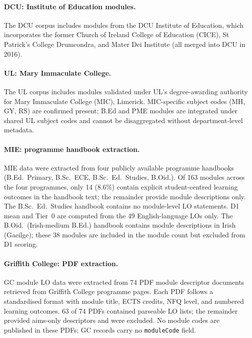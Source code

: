 \documentclass[12pt, a4paper]{article}
\begin{document}
\paragraph{DCU: Institute of Education modules.}
The DCU corpus includes modules from the DCU Institute of Education, which
incorporates the former Church of Ireland College of Education (CICE), St Patrick's
College Drumcondra, and Mater Dei Institute (all merged into DCU in 2016).

\paragraph{UL: Mary Immaculate College.}
The UL corpus includes modules validated under UL's degree-awarding authority for
Mary Immaculate College (MIC), Limerick. MIC-specific subject codes (MH, GY, RS) are
confirmed present; B.Ed and PME modules are integrated under shared UL subject codes
and cannot be disaggregated without department-level metadata.

\paragraph{MIE: programme handbook extraction.}
MIE data were extracted from four publicly available programme handbooks (B.Ed.\
Primary, B.Sc.\ ECE, B.Sc.\ Ed.\ Studies, B.Oid.). Of 163 modules across the four
programmes, only 14 (8.6\%) contain explicit student-centred learning outcomes in the
handbook text; the remainder provide module descriptions only. The B.Sc.\ Ed.\ Studies
handbook contains no module-level LO statements. D1 mean and Tier~0 are computed from
the 49 English-language LOs only. The B.Oid.\ (Irish-medium B.Ed.) handbook contains
module descriptions in Irish (Gaeilge); these 38 modules are included in the module
count but excluded from D1 scoring.

\paragraph{Griffith College: PDF extraction.}
GC module LO data were extracted from 74 PDF module descriptor documents retrieved
from Griffith College programme pages. Each PDF follows a standardised format with
module title, ECTS credits, NFQ level, and numbered learning outcomes. 63 of 74 PDFs
contained parseable LO lists; the remainder provided aims-only descriptors and were
excluded. No module codes are published in these PDFs; GC records carry no
\texttt{moduleCode} field.
\end{document}
